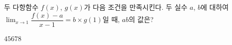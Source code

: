 두 다항함수 $f(x)$, $g(x)$가 다음 조건을 만족시킨다. \noindent 두 실수 $a$, $b$에 대하여 $\displaystyle\lim_{x\to 1}\dfrac{f(x)-a}{x-1}=b\times g(1)$일 때, $ab$의 값은?
\begin{choices32}{$4$}{$5$}{$6$}{$7$}{$8$}\end{choices32}
